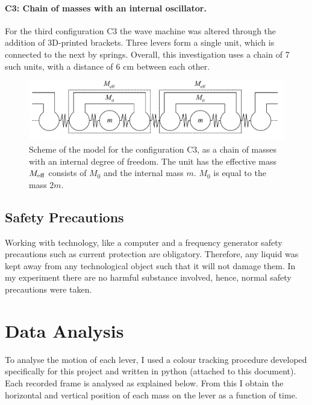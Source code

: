 \documentclass[12pt]{article}
\begin{document}
\paragraph{C3: Chain of masses with an internal oscillator.}For the third configuration C3 the wave machine was altered through the addition of 3D-printed brackets. Three levers form a single unit, which is connected to the next by springs. Overall, this investigation uses a chain of 7 such units, with a distance of 6 cm between each other.
\begin{figure}[hbt]	
  \includegraphics[width=.7\columnwidth]{configurations/condition2.pdf}
  \caption{Scheme of the model for the configuration C3, as a chain of masses with an internal degree of freedom. The unit has the effective mass $M_{\rm eff}$ consists of $M_0$ and the internal mass $m$. $M_0$ is equal to the mass $2m$.} \label{fig:figure8}
\end{figure}

\subsection{Safety Precautions}
Working with technology, like a computer and a frequency generator safety precautions such as current protection are obligatory. Therefore, any liquid was kept away from any technological object such that it will not damage them. In my experiment there are no harmful substance involved, hence, normal safety precautions were taken. 

\section{Data Analysis}\label{sec:section4}
To analyse the motion of each lever, I used a colour tracking procedure developed specifically for this project and written in python (attached to this document). Each recorded frame is analysed as explained below. From this I obtain the horizontal and vertical position of each mass on the lever as a function of time. 

\end{document}
